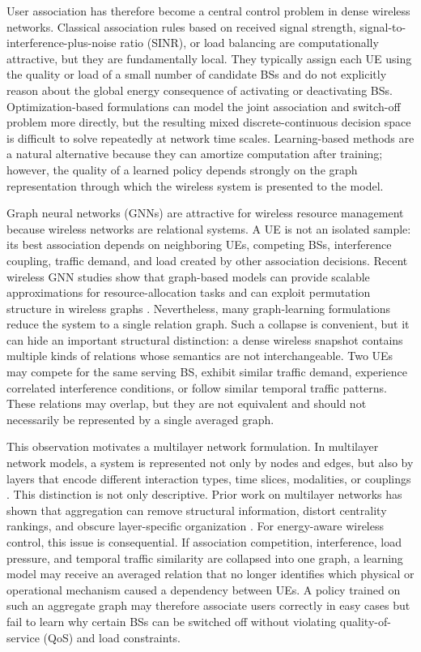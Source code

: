 \documentclass[journal]{IEEEtran}
\begin{document}
User association has therefore become a central control problem in dense
wireless networks. Classical association rules based on received signal
strength, signal-to-interference-plus-noise ratio (SINR), or load balancing are
computationally attractive, but they are fundamentally local. They typically
assign each UE using the quality or load of a small number of candidate BSs and
do not explicitly reason about the global energy consequence of activating or
deactivating BSs. Optimization-based formulations can model the joint
association and switch-off problem more directly, but the resulting mixed
discrete-continuous decision space is difficult to solve repeatedly at network
time scales. Learning-based methods are a natural alternative because they can
amortize computation after training; however, the quality of a learned policy
depends strongly on the graph representation through which the wireless system
is presented to the model.

Graph neural networks (GNNs) are attractive for wireless resource management
because wireless networks are relational systems. A UE is not an isolated
sample: its best association depends on neighboring UEs, competing BSs,
interference coupling, traffic demand, and load created by other association
decisions. Recent wireless GNN studies show that graph-based models can provide
scalable approximations for resource-allocation tasks and can exploit
permutation structure in wireless graphs \cite{eisen2020optimal,shen2021scalable}.
Nevertheless, many graph-learning formulations reduce the system to a single
relation graph. Such a collapse is convenient, but it can hide an important
structural distinction: a dense wireless snapshot contains multiple kinds of
relations whose semantics are not interchangeable. Two UEs may compete for the
same serving BS, exhibit similar traffic demand, experience correlated
interference conditions, or follow similar temporal traffic patterns. These
relations may overlap, but they are not equivalent and should not necessarily
be represented by a single averaged graph.

This observation motivates a multilayer network formulation. In multilayer
network models, a system is represented not only by nodes and edges, but also
by layers that encode different interaction types, time slices, modalities, or
couplings \cite{kivela2014multilayer,dedomenico2013mathematical,boccaletti2014structure}.
This distinction is not only descriptive. Prior work on multilayer networks has
shown that aggregation can remove structural information, distort centrality
rankings, and obscure layer-specific organization
\cite{dedomenico2015reducibility,dedomenico2015versatile}. For energy-aware
wireless control, this issue is consequential. If association competition,
interference, load pressure, and temporal traffic similarity are collapsed into
one graph, a learning model may receive an averaged relation that no longer
identifies which physical or operational mechanism caused a dependency between
UEs. A policy trained on such an aggregate graph may therefore associate users
correctly in easy cases but fail to learn why certain BSs can be switched off
without violating quality-of-service (QoS) and load constraints.
\end{document}
